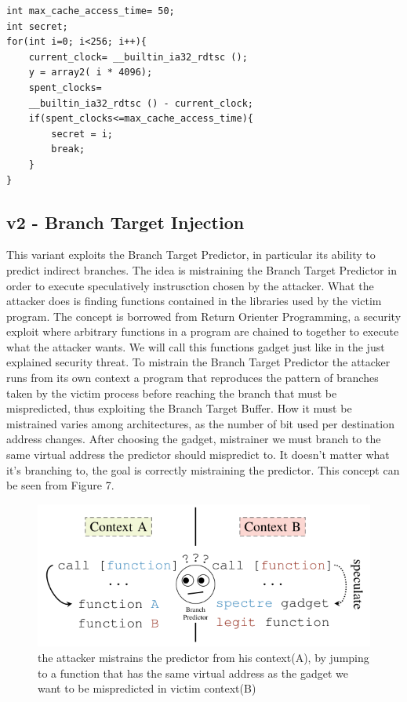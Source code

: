 \begin{Verbatim}[fontsize=\small]
int max_cache_access_time= 50;
int secret;
for(int i=0; i<256; i++){
	current_clock= __builtin_ia32_rdtsc ();
	y = array2( i * 4096);
	spent_clocks=
	__builtin_ia32_rdtsc () - current_clock;
	if(spent_clocks<=max_cache_access_time){
		secret = i;
		break;
	}
}
\end{Verbatim}

\subsection{v2 - Branch Target Injection}
This variant exploits the Branch Target Predictor, in particular its ability to predict indirect branches.
The idea is mistraining the Branch Target Predictor in order to execute speculatively instrusction chosen by the attacker.
What the attacker does is finding functions contained in the libraries used by the victim program.
The concept is borrowed from Return Orienter Programming, a security exploit where arbitrary functions in a program are chained to together to execute what the attacker wants.
We will call this functions gadget just like in the just explained security threat.
To mistrain the Branch Target Predictor the attacker runs from its own context a program that reproduces the pattern of branches taken by the victim process before reaching the branch that must be mispredicted, thus exploiting the Branch Target Buffer.
How it must be mistrained varies among architectures, as the number of bit used per destination address changes.
After choosing the gadget, mistrainer we must branch to the same virtual address the predictor should mispredict to.
It doesn't matter what it's branching to, the goal is correctly mistraining the predictor.
This concept can be seen from Figure 7.

\begin{figure}[!h]
    \includegraphics[scale=0.4]{img/sv2-mistraining.png}
    \caption{the attacker mistrains the predictor from his context(A), by jumping to a function that has the same virtual address as the gadget we want to be mispredicted in victim context(B)}
\end{figure}

